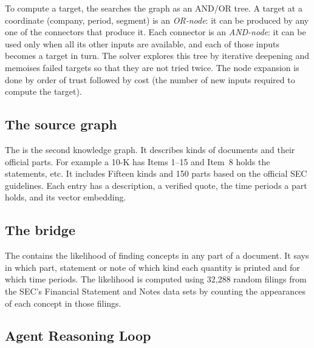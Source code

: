 


To compute a target, the  searches the graph as an AND/OR tree.
A target at a coordinate (company, period, segment) is an \emph{OR-node}: it can
be produced by any one of the connectors that produce it. Each connector is an
\emph{AND-node}: it can be used only when all its other inputs are available, and
each of those inputs becomes a target in turn. The solver explores this tree by
iterative deepening and memoises failed targets so that they are not tried twice. The node expansion is done by order of trust followed by cost (the number of new inputs required to compute the target).



\subsection{The source graph}
\label{sec:idea-source}

The  is the second knowledge graph. It describes kinds of documents and their official parts. For example a 10-K has Items 1--15 and Item~8 holds the statements, etc. It includes Fifteen kinds and 150 parts based on the official SEC guidelines. Each entry has a description, a verified quote, the time periods a part holds, and its vector embedding.

\subsection{The bridge}
\label{sec:idea-bridge}

The  contains the likelihood of finding concepts in any part of a document. It says in which part, statement or note of which kind each quantity is printed and for which time periods. The likelihood is computed using 32,288 random filings from the SEC's Financial Statement and Notes data sets by counting the appearances of each concept in those filings. 

\subsection{Agent Reasoning Loop}
\label{sec:impl-loop}

